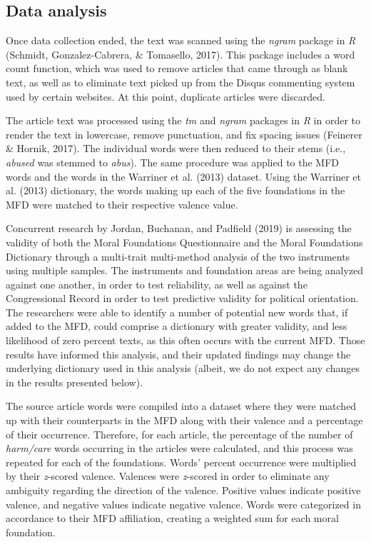 \documentclass[english,,man]{apa6}
\begin{document}
\subsection{Data analysis}\label{data-analysis}

Once data collection ended, the text was scanned using the \emph{ngram}
package in \emph{R} (Schmidt, Gonzalez-Cabrera, \& Tomasello, 2017).
This package includes a word count function, which was used to remove
articles that came through as blank text, as well as to eliminate text
picked up from the Disqus commenting system used by certain websites. At
this point, duplicate articles were discarded.

The article text was processed using the \emph{tm} and \emph{ngram}
packages in \emph{R} in order to render the text in lowercase, remove
punctuation, and fix spacing issues (Feinerer \& Hornik, 2017). The
individual words were then reduced to their stems (i.e., \emph{abused}
was stemmed to \emph{abus}). The same procedure was applied to the MFD
words and the words in the Warriner et al. (2013) dataset. Using the
Warriner et al. (2013) dictionary, the words making up each of the five
foundations in the MFD were matched to their respective valence value.

Concurrent research by Jordan, Buchanan, and Padfield (2019) is
assessing the validity of both the Moral Foundations Questionnaire and
the Moral Foundations Dictionary through a multi-trait multi-method
analysis of the two instruments using multiple samples. The instruments
and foundation areas are being analyzed against one another, in order to
test reliability, as well as against the Congressional Record in order
to test predictive validity for political orientation. The researchers
were able to identify a number of potential new words that, if added to
the MFD, could comprise a dictionary with greater validity, and less
likelihood of zero percent texts, as this often occurs with the current
MFD. Those results have informed this analysis, and their updated
findings may change the underlying dictionary used in this analysis
(albeit, we do not expect any changes in the results presented below).

The source article words were compiled into a dataset where they were
matched up with their counterparts in the MFD along with their valence
and a percentage of their occurrence. Therefore, for each article, the
percentage of the number of \emph{harm/care} words occurring in the
articles were calculated, and this process was repeated for each of the
foundations. Words' percent occurrence were multiplied by their
\emph{z}-scored valence. Valences were \emph{z}-scored in order to
eliminate any ambiguity regarding the direction of the valence. Positive
values indicate positive valence, and negative values indicate negative
valence. Words were categorized in accordance to their MFD affiliation,
creating a weighted sum for each moral foundation.
\end{document}
